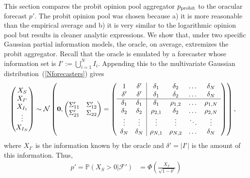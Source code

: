 \documentclass[11pt]{article}
\renewcommand{\P}{\mathbb{P}}
\theoremstyle{definition}
\theoremstyle{definition}
\def\P{{\mathbb P}}
\def\probit{p_{\rm probit}}
\begin{document}
This section compares the probit opinion pool aggregator $\probit$ 
to the oracular forecast $p'$. The probit opinion pool was chosen because a) it is more reasonable than the empirical average and b) it is very similar to the logarithmic opinion pool but results in cleaner analytic expressions.  We show that, under two specific Gaussian partial 
information models, the oracle, on average,
extremizes the probit aggregator.  Recall that the oracle is emulated
by a forecaster whose information set is $I' := \bigcup_{i=1}^N I_i$.
Appending this to the multivariate Gaussian distribution~(\ref{Nforecasters}) gives
\begin{align}
\left(\begin{matrix} X_S \\ X_{I'} \\ X_{I_1}\\ \vdots \\ X_{I_N} 
 \end{matrix}\right) &\sim \mathcal{N}\left( 
 \boldsymbol{0}, \left(\begin{matrix} 
\Sigma_{11}' & \Sigma_{12}'\\
\Sigma_{21}' & \Sigma_{22}\\
 \end{matrix}\right) 
 =
 \left(\begin{array}{c c| c c cc }
1 & \delta' & \delta_1 & \delta_2 & \dots & \delta_N  \\ 
\delta' & \delta' & \delta_1 & \delta_2 & \dots & \delta_N  \\ \hline
\delta_1& \delta_1 & \delta_1 &\rho_{1,2} & \dots & \rho_{1,N}   \\ 
\delta_2 & \delta_2 &\rho_{2,1} & \delta_2 & \dots & \rho_{2,N}  \\ 
\vdots &\vdots & \vdots & \vdots & \ddots & \vdots  \\ 
\delta_N &\delta_N & \rho_{N,1} & \rho_{N,2} & \dots & \delta_N\\ 
 \end{array}\right)\right), \label{oracleN} 
\end{align}
where  $X_{I'}$  is the information known by the oracle and $\delta' = |I'|$ is the amount of this information.  Thus,
 \begin{align*}
p' = \P(X_S > 0 |  \mathcal{F}') 
   &= \Phi\left( \frac{X_{I'}}{\sqrt{1-\delta'}} \right)
\end{align*}
\end{document}
